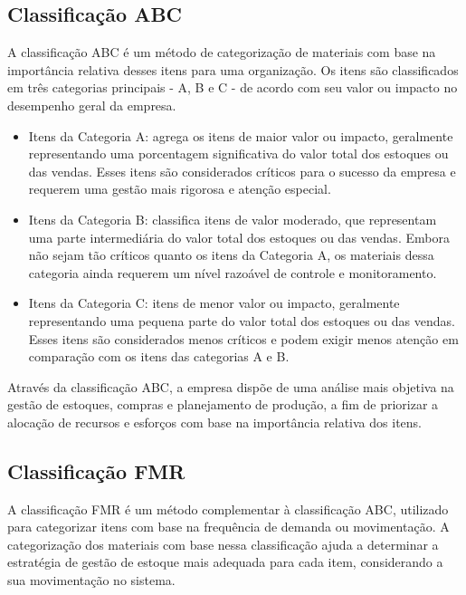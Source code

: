 \subsection{Classificação ABC}

A classificação ABC é um método de categorização de materiais com base na importância relativa desses itens para uma organização. Os itens são classificados em três categorias principais - A, B e C - de acordo com seu valor ou impacto no desempenho geral da empresa.

\begin{itemize}
	\item Itens da Categoria A: agrega os itens de maior valor ou impacto, geralmente representando uma porcentagem significativa do valor total dos estoques ou das vendas. Esses itens são considerados críticos para o sucesso da empresa e requerem uma gestão mais rigorosa e atenção especial.
	\item Itens da Categoria B: classifica itens de valor moderado, que representam uma parte intermediária do valor total dos estoques ou das vendas. Embora não sejam tão críticos quanto os itens da Categoria A, os materiais dessa categoria ainda requerem um nível razoável de controle e monitoramento.
	\item Itens da Categoria C: itens de menor valor ou impacto, geralmente representando uma pequena parte do valor total dos estoques ou das vendas. Esses itens são considerados menos críticos e podem exigir menos atenção em comparação com os itens das categorias A e B.
\end{itemize}

Através da classificação ABC, a empresa dispõe de uma análise mais objetiva na gestão de estoques, compras e planejamento de produção, a fim de priorizar a alocação de recursos e esforços com base na importância relativa dos itens.

\subsection{Classificação FMR}

A classificação FMR é um método complementar à classificação ABC, utilizado para categorizar itens com base na frequência de demanda ou movimentação. A categorização dos materiais com base nessa classificação ajuda a determinar a estratégia de gestão de estoque mais adequada para cada item, considerando a sua movimentação no sistema.

